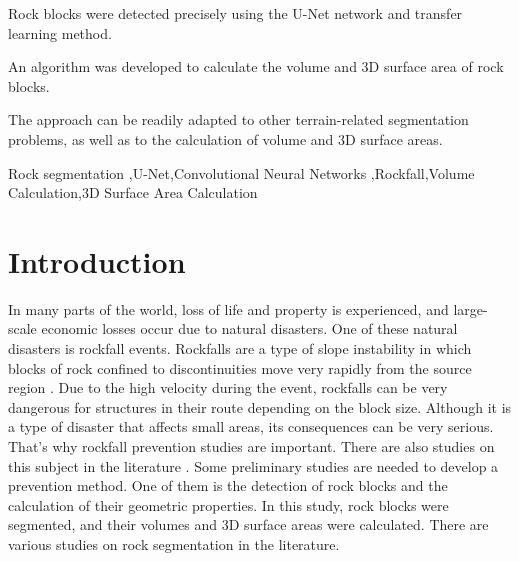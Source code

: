 \documentclass[a4paper,fleqn]{cas-sc}
\begin{document}
 
\begin{highlights}
\item Rock blocks were detected precisely using the U-Net network and transfer learning method.
\item An algorithm was developed to calculate the volume and 3D surface area of rock blocks.
\item The approach can be readily adapted to other terrain-related segmentation problems, as well as to the calculation of volume and 3D surface areas.

\end{highlights}

\begin{keywords}
Rock segmentation \sep U-Net\sep Convolutional Neural Networks \sep Rockfall\sep Volume Calculation\sep 3D Surface Area Calculation
\end{keywords}

\maketitle 

\printcredits

\doublespacing


\section{Introduction}
\label{intro}
In many parts of the world, loss of life and property is experienced, and large-scale economic losses occur due to natural disasters. One of these natural disasters is rockfall events. Rockfalls are a type of slope instability in which blocks of rock confined to discontinuities move very rapidly from the source region \citep{varnes1978slope, hutchinson1988morphological, CrudenVarnes1996}. Due to the high velocity during the event, rockfalls can be very dangerous for structures in their route depending on the block size. Although it is a type of disaster that affects small areas, its consequences can be very serious. That's why rockfall prevention studies are important. There are also studies on this subject in the literature \citep{liu2021trajectory, keskin2022kinematic,ji2023assessment,kainthola2023stability, cao2024risk}. Some preliminary studies are needed to develop a prevention method. One of them is the detection of rock blocks and the calculation of their geometric properties. In this study, rock blocks were segmented, and their volumes and 3D surface areas were calculated. There are various studies on rock segmentation in the literature.
\end{document}

